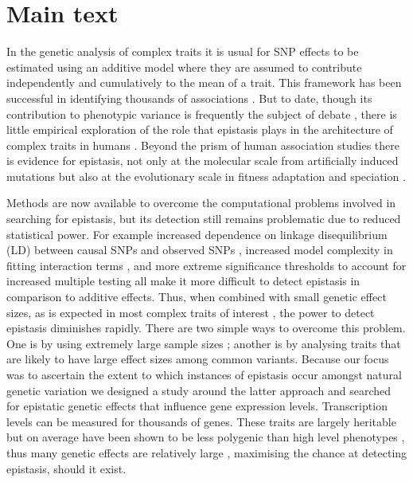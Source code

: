 \documentclass{article}
\begin{document}
\section*{Main text}

In the genetic analysis of complex traits it is usual for SNP effects to be estimated using an additive model where they are assumed to contribute independently and cumulatively to the mean of a trait. This framework has been successful in identifying thousands of associations \cite{Visscher2012}. But to date, though its contribution to phenotypic variance is frequently the subject of debate \cite{Carlborg2004, Hill2008a, Crow2010}, there is little empirical exploration of the role that epistasis plays in the architecture of complex traits in humans \cite{Strange2010, Evans2011}. Beyond the prism of human association studies there is evidence for epistasis, not only at the molecular scale from artificially induced mutations \cite{Costanzo2010} but also at the evolutionary scale in fitness adaptation \cite{Weinreich2006} and speciation \cite{Breen2012}.

Methods are now available to overcome the computational problems involved in searching for epistasis, but its detection still remains problematic due to reduced statistical power. For example increased dependence on linkage disequilibrium (LD) between causal SNPs and observed SNPs \cite{Weir2008, Hemani2013}, increased model complexity in fitting interaction terms \cite{Marchini2005}, and more extreme significance thresholds to account for increased multiple testing \cite{Cordell2009} all make it more difficult to detect epistasis in comparison to additive effects. Thus, when combined with small genetic effect sizes, as is expected in most complex traits of interest \cite{Visscher2012}, the power to detect epistasis diminishes rapidly. There are two simple ways to overcome this problem. One is by using extremely large sample sizes \cite{LangoAllen2010}; another is by analysing traits that are likely to have large effect sizes among common variants. Because our focus was to ascertain the extent to which instances of epistasis occur amongst natural genetic variation we designed a study around the latter approach and searched for epistatic genetic effects that influence gene expression levels. Transcription levels can be measured for thousands of genes. These traits are largely heritable but on average have been shown to be less polygenic than high level phenotypes \cite{Powell2013}, thus many genetic effects are relatively large \cite{Powell2012}, maximising the chance at detecting epistasis, should it exist.
\end{document}
